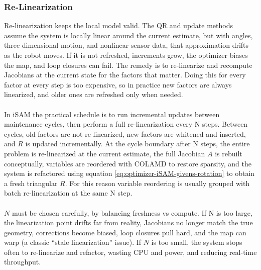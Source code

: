 \subsubsection{Re-Linearization}
Re-linearization keeps the local model valid. The QR and update methods assume the system is locally linear around the current estimate, but with angles, three dimensional motion, and nonlinear sensor data, that approximation drifts as the robot moves. If it is not refreshed, increments grow, the optimizer biases the map, and loop closures can fail. The remedy is to re-linearize and recompute Jacobians at the current state for the factors that matter. Doing this for every factor at every step is too expensive, so in practice new factors are always linearized, and older ones are refreshed only when needed.
\\ \\
In iSAM the practical schedule is to run incremental updates between maintenance cycles, then perform a full re-linearization every N steps. Between cycles, old factors are not re-linearized, new factors are whitened and inserted, and $R$ is updated incrementally. At the cycle boundary after N steps, the entire problem is re-linearized at the current estimate, the full Jacobian $A$ is rebuilt conceptually, variables are reordered with COLAMD to restore sparsity, and the system is refactored using equation \eqref{eq:optimizer-iSAM-givens-rotation} to obtain a fresh triangular $R$. For this reason variable reordering is usually grouped with batch re-linearization at the same N step.
\\ \\
$N$ must be chosen carefully, by balancing freshness vs compute. If N is too large, the linearization point drifts far from reality, Jacobians no longer match the true geometry, corrections become biased, loop closures pull hard, and the map can warp (a classic ``stale linearization'' issue). If $N$ is too small, the system stops often to re-linearize and refactor, wasting CPU and power, and reducing real-time throughput.



